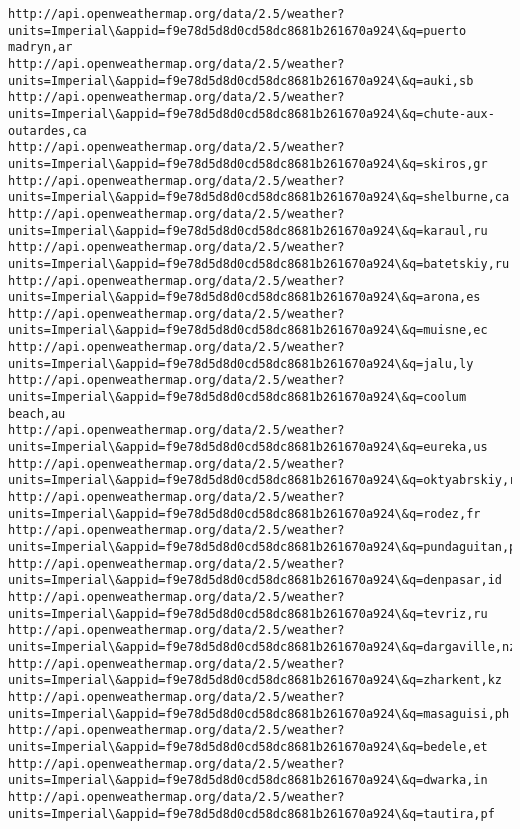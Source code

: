 \documentclass[11pt]{article}
\begin{document}
\begin{Verbatim}[commandchars=\\\{\}]
http://api.openweathermap.org/data/2.5/weather?units=Imperial\&appid=f9e78d5d8d0cd58dc8681b261670a924\&q=puerto madryn,ar
http://api.openweathermap.org/data/2.5/weather?units=Imperial\&appid=f9e78d5d8d0cd58dc8681b261670a924\&q=auki,sb
http://api.openweathermap.org/data/2.5/weather?units=Imperial\&appid=f9e78d5d8d0cd58dc8681b261670a924\&q=chute-aux-outardes,ca
http://api.openweathermap.org/data/2.5/weather?units=Imperial\&appid=f9e78d5d8d0cd58dc8681b261670a924\&q=skiros,gr
http://api.openweathermap.org/data/2.5/weather?units=Imperial\&appid=f9e78d5d8d0cd58dc8681b261670a924\&q=shelburne,ca
http://api.openweathermap.org/data/2.5/weather?units=Imperial\&appid=f9e78d5d8d0cd58dc8681b261670a924\&q=karaul,ru
http://api.openweathermap.org/data/2.5/weather?units=Imperial\&appid=f9e78d5d8d0cd58dc8681b261670a924\&q=batetskiy,ru
http://api.openweathermap.org/data/2.5/weather?units=Imperial\&appid=f9e78d5d8d0cd58dc8681b261670a924\&q=arona,es
http://api.openweathermap.org/data/2.5/weather?units=Imperial\&appid=f9e78d5d8d0cd58dc8681b261670a924\&q=muisne,ec
http://api.openweathermap.org/data/2.5/weather?units=Imperial\&appid=f9e78d5d8d0cd58dc8681b261670a924\&q=jalu,ly
http://api.openweathermap.org/data/2.5/weather?units=Imperial\&appid=f9e78d5d8d0cd58dc8681b261670a924\&q=coolum beach,au
http://api.openweathermap.org/data/2.5/weather?units=Imperial\&appid=f9e78d5d8d0cd58dc8681b261670a924\&q=eureka,us
http://api.openweathermap.org/data/2.5/weather?units=Imperial\&appid=f9e78d5d8d0cd58dc8681b261670a924\&q=oktyabrskiy,ru
http://api.openweathermap.org/data/2.5/weather?units=Imperial\&appid=f9e78d5d8d0cd58dc8681b261670a924\&q=rodez,fr
http://api.openweathermap.org/data/2.5/weather?units=Imperial\&appid=f9e78d5d8d0cd58dc8681b261670a924\&q=pundaguitan,ph
http://api.openweathermap.org/data/2.5/weather?units=Imperial\&appid=f9e78d5d8d0cd58dc8681b261670a924\&q=denpasar,id
http://api.openweathermap.org/data/2.5/weather?units=Imperial\&appid=f9e78d5d8d0cd58dc8681b261670a924\&q=tevriz,ru
http://api.openweathermap.org/data/2.5/weather?units=Imperial\&appid=f9e78d5d8d0cd58dc8681b261670a924\&q=dargaville,nz
http://api.openweathermap.org/data/2.5/weather?units=Imperial\&appid=f9e78d5d8d0cd58dc8681b261670a924\&q=zharkent,kz
http://api.openweathermap.org/data/2.5/weather?units=Imperial\&appid=f9e78d5d8d0cd58dc8681b261670a924\&q=masaguisi,ph
http://api.openweathermap.org/data/2.5/weather?units=Imperial\&appid=f9e78d5d8d0cd58dc8681b261670a924\&q=bedele,et
http://api.openweathermap.org/data/2.5/weather?units=Imperial\&appid=f9e78d5d8d0cd58dc8681b261670a924\&q=dwarka,in
http://api.openweathermap.org/data/2.5/weather?units=Imperial\&appid=f9e78d5d8d0cd58dc8681b261670a924\&q=tautira,pf

\end{Verbatim}
\end{document}

